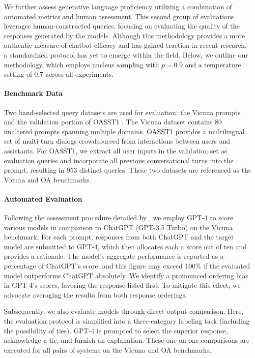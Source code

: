 We further assess generative language proficiency utilizing a combination of automated metrics and human assessment. This second group of evaluations leverages human-constructed queries, focusing on evaluating the quality of the responses generated by the models. Although this methodology provides a more authentic measure of chatbot efficacy and has gained traction in recent research, a standardized protocol has yet to emerge within the field. Below, we outline our methodology, which employs nucleus sampling with $p=0.9$ and a temperature setting of $0.7$ across all experiments.

\paragraph{Benchmark Data} Two hand-selected query datasets are used for evaluation: the Vicuna prompts \citep{vicuna2023} and the validation portion of OASST1 \citep{kopf2023openassistant}. The Vicuna dataset contains 80 unaltered prompts spanning multiple domains. OASST1 provides a multilingual set of multi-turn dialogs crowdsourced from interactions between users and assistants. For OASST1, we extract all user inputs in the validation set as evaluation queries and incorporate all previous conversational turns into the prompt, resulting in 953 distinct queries. These two datasets are referenced as the Vicuna and OA benchmarks.

\paragraph{Automated Evaluation} Following the assessment procedure detailed by \citet{vicuna2023}, we employ GPT-4 to score various models in comparison to ChatGPT (GPT-3.5 Turbo) on the Vicuna benchmark. For each prompt, responses from both ChatGPT and the target model are submitted to GPT-4, which then allocates each a score out of ten and provides a rationale. The model's aggregate performance is reported as a percentage of ChatGPT's score, and this figure may exceed 100\% if the evaluated model outperforms ChatGPT absolutely. We identify a pronounced ordering bias in GPT-4’s scores, favoring the response listed first. To mitigate this effect, we advocate averaging the results from both response orderings.

Subsequently, we also evaluate models through direct output comparison. Here, the evaluation protocol is simplified into a three-category labeling task (including the possibility of ties). GPT-4 is prompted to select the superior response, acknowledge a tie, and furnish an explanation. These one-on-one comparisons are executed for all pairs of systems on the Vicuna and OA benchmarks.

